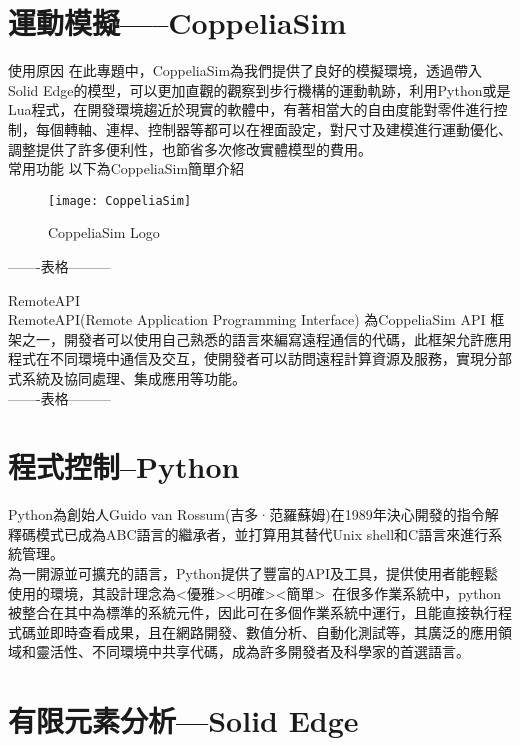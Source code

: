 \section{運動模擬-----CoppeliaSim}
\qquad 使用原因
在此專題中，CoppeliaSim為我們提供了良好的模擬環境，透過帶入Solid Edge的模型，可以更加直觀的觀察到步行機構的運動軌跡，利用Python或是Lua程式，在開發環境趨近於現實的軟體中，有著相當大的自由度能對零件進行控制，每個轉軸、連桿、控制器等都可以在裡面設定，對尺寸及建模進行運動優化、調整提供了許多便利性，也節省多次修改實體模型的費用。\\

\qquad 常用功能
\qquad 以下為CoppeliaSim簡單介紹\

\begin{figure}[hbt!]
\center
\texttt{[image: CoppeliaSim]}
\caption{\Large CoppeliaSim Logo}
\end{figure}
-------表格---------

\qquad RemoteAPI\\

RemoteAPI(Remote Application Programming Interface) 為CoppeliaSim API 框架之一，開發者可以使用自己熟悉的語言來編寫遠程通信的代碼，此框架允許應用程式在不同環境中通信及交互，使開發者可以訪問遠程計算資源及服務，實現分部式系統及協同處理、集成應用等功能。\\

-------表格---------
\newpage

\section{程式控制--Python}
Python為創始人Guido van Rossum(吉多·范羅蘇姆)在1989年決心開發的指令解釋碼模式已成為ABC語言的繼承者，並打算用其替代Unix shell和C語言來進行系統管理。\\

為一開源並可擴充的語言，Python提供了豐富的API及工具，提供使用者能輕鬆使用的環境，其設計理念為<優雅><明確><簡單>\
在很多作業系統中，python被整合在其中為標準的系統元件，因此可在多個作業系統中運行，且能直接執行程式碼並即時查看成果，且在網路開發、數值分析、自動化測試等，其廣泛的應用領域和靈活性、不同環境中共享代碼，成為許多開發者及科學家的首選語言。\\

\section{有限元素分析—Solid Edge}

